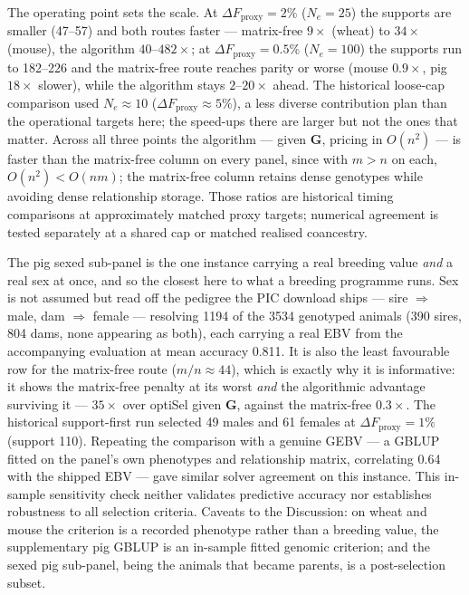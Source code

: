\documentclass[11pt]{article}
\newcommand{\bG}{\mathbf{G}}
\begin{document}
The operating point sets the scale. At $\Delta F_{\mathrm{proxy}}=2\%$ ($N_e=25$) the supports are smaller (47--57) and both routes faster --- matrix-free $9\times$ (wheat) to $34\times$ (mouse), the algorithm $40$--$482\times$; at $\Delta F_{\mathrm{proxy}}=0.5\%$ ($N_e=100$) the supports run to 182--226 and the matrix-free route reaches parity or worse (mouse $0.9\times$, pig $18\times$ slower), while the algorithm stays $2$--$20\times$ ahead. The historical loose-cap comparison used $N_e\approx10$ ($\Delta F_{\mathrm{proxy}}\approx5\%$), a less diverse contribution plan than the operational targets here; the speed-ups there are larger but not the ones that matter. Across all three points the algorithm --- given $\bG$, pricing in $O(n^2)$ --- is faster than the matrix-free column on every panel, since with $m>n$ on each, $O(n^2)<O(nm)$; the matrix-free column retains dense genotypes while avoiding dense relationship storage. Those ratios are historical timing comparisons at approximately matched proxy targets; numerical agreement is tested separately at a shared cap or matched realised coancestry.

The pig sexed sub-panel is the one instance carrying a real breeding value \emph{and} a real sex at once, and so the closest here to what a breeding programme runs. Sex is not assumed but read off the pedigree the PIC download ships --- sire $\Rightarrow$ male, dam $\Rightarrow$ female --- resolving 1194 of the 3534 genotyped animals (390 sires, 804 dams, none appearing as both), each carrying a real EBV from the accompanying evaluation at mean accuracy 0.811. It is also the least favourable row for the matrix-free route ($m/n\approx44$), which is exactly why it is informative: it shows the matrix-free penalty at its worst \emph{and} the algorithmic advantage surviving it --- $35\times$ over optiSel given $\bG$, against the matrix-free $0.3\times$. The historical support-first run selected 49 males and 61 females at $\Delta F_{\mathrm{proxy}}=1\%$ (support 110). Repeating the comparison with a genuine GEBV --- a GBLUP fitted on the panel's own phenotypes and relationship matrix, correlating 0.64 with the shipped EBV --- gave similar solver agreement on this instance. This in-sample sensitivity check neither validates predictive accuracy nor establishes robustness to all selection criteria. Caveats to the Discussion: on wheat and mouse the criterion is a recorded phenotype rather than a breeding value, the supplementary pig GBLUP is an in-sample fitted genomic criterion; and the sexed pig sub-panel, being the animals that became parents, is a post-selection subset.
\end{document}
